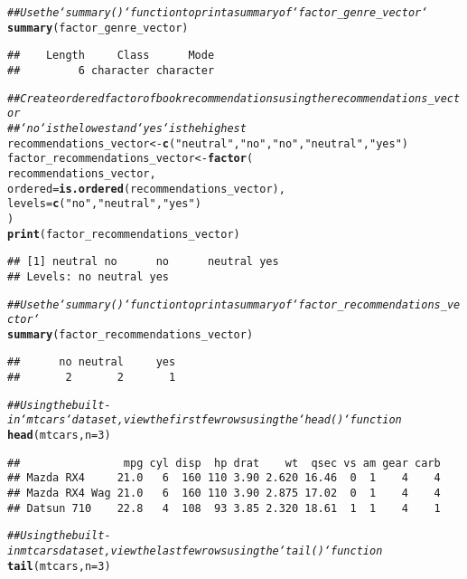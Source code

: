 \documentclass{article}\usepackage[]{graphicx}\usepackage[]{xcolor}
\makeatletter
\newcommand{\hlnum}[1]{\textcolor[rgb]{0.686,0.059,0.569}{#1}}%
\newcommand{\hlstr}[1]{\textcolor[rgb]{0.192,0.494,0.8}{#1}}%
\newcommand{\hlcom}[1]{\textcolor[rgb]{0.678,0.584,0.686}{\textit{#1}}}%
\newcommand{\hlstd}[1]{\textcolor[rgb]{0.345,0.345,0.345}{#1}}%
\newcommand{\hlkwb}[1]{\textcolor[rgb]{0.69,0.353,0.396}{#1}}%
\newcommand{\hlkwc}[1]{\textcolor[rgb]{0.333,0.667,0.333}{#1}}%
\newcommand{\hlkwd}[1]{\textcolor[rgb]{0.737,0.353,0.396}{\textbf{#1}}}%
\newenvironment{kframe}{%
 \def\at@end@of@kframe{}%
 \ifinner\ifhmode%
  \def\at@end@of@kframe{\end{minipage}}%
  \begin{minipage}{\columnwidth}%
 \fi\fi%
 \def\FrameCommand##1{\hskip\@totalleftmargin \hskip-\fboxsep
 \colorbox{shadecolor}{##1}\hskip-\fboxsep
     \hskip-\linewidth \hskip-\@totalleftmargin \hskip\columnwidth}%
 \MakeFramed {\advance\hsize-\width
   \@totalleftmargin\z@ \linewidth\hsize
   \@setminipage}}%
 {\par\unskip\endMakeFramed%
 \at@end@of@kframe}
\newenvironment{knitrout}{}{} %
\makeatother
\begin{document}
\begin{knitrout}
\begin{kframe}
\begin{alltt}
\hlcom{## Use the `summary()` function to print a summary of `factor_genre_vector`}
\hlkwd{summary}\hlstd{(factor_genre_vector)}
\end{alltt}
\begin{verbatim}
##    Length     Class      Mode 
##         6 character character
\end{verbatim}
\begin{alltt}
\hlcom{## Create ordered factor of book recommendations using the recommendations_vector}
\hlcom{## `no` is the lowest and `yes` is the highest}
\hlstd{recommendations_vector} \hlkwb{<-} \hlkwd{c}\hlstd{(}\hlstr{"neutral"}\hlstd{,} \hlstr{"no"}\hlstd{,} \hlstr{"no"}\hlstd{,} \hlstr{"neutral"}\hlstd{,} \hlstr{"yes"}\hlstd{)}
\hlstd{factor_recommendations_vector} \hlkwb{<-} \hlkwd{factor}\hlstd{(}
  \hlstd{recommendations_vector,}
  \hlkwc{ordered} \hlstd{=} \hlkwd{is.ordered}\hlstd{(recommendations_vector),}
  \hlkwc{levels} \hlstd{=} \hlkwd{c}\hlstd{(}\hlstr{"no"}\hlstd{,} \hlstr{"neutral"}\hlstd{,} \hlstr{"yes"}\hlstd{)}
\hlstd{)}
\hlkwd{print}\hlstd{(factor_recommendations_vector)}
\end{alltt}
\begin{verbatim}
## [1] neutral no      no      neutral yes    
## Levels: no neutral yes
\end{verbatim}
\begin{alltt}
\hlcom{## Use the `summary()` function to print a summary of `factor_recommendations_vector`}
\hlkwd{summary}\hlstd{(factor_recommendations_vector)}
\end{alltt}
\begin{verbatim}
##      no neutral     yes 
##       2       2       1
\end{verbatim}
\begin{alltt}
\hlcom{## Using the built-in `mtcars` dataset, view the first few rows using the `head()` function}
\hlkwd{head}\hlstd{(mtcars,} \hlkwc{n}\hlstd{=}\hlnum{3}\hlstd{)}
\end{alltt}
\begin{verbatim}
##                mpg cyl disp  hp drat    wt  qsec vs am gear carb
## Mazda RX4     21.0   6  160 110 3.90 2.620 16.46  0  1    4    4
## Mazda RX4 Wag 21.0   6  160 110 3.90 2.875 17.02  0  1    4    4
## Datsun 710    22.8   4  108  93 3.85 2.320 18.61  1  1    4    1
\end{verbatim}
\begin{alltt}
\hlcom{## Using the built-in mtcars dataset, view the last few rows using the `tail()` function}
\hlkwd{tail}\hlstd{(mtcars,} \hlkwc{n}\hlstd{=}\hlnum{3}\hlstd{)}

\end{alltt}
\end{kframe}
\end{knitrout}
\end{document}
